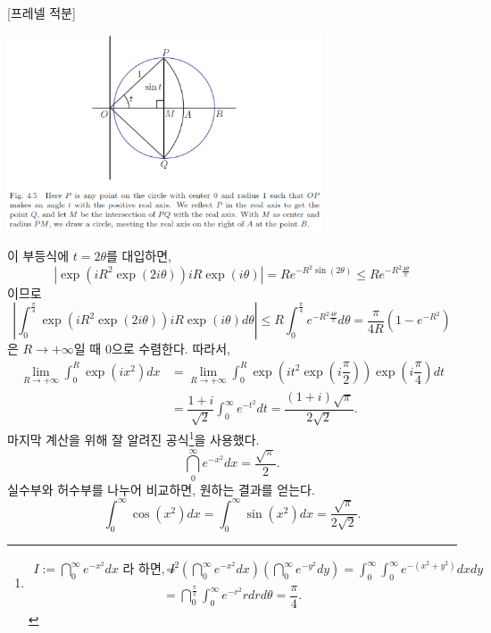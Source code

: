 \begin{saltexample}[label=example-4-20]{[프레넬 적분]}{}
\begin{center}
\includegraphics[width=0.7\textwidth]{./SaltChapter/fig-4-5}
\end{center}
\label{fig-4-5}
이 부등식에 $t=2\theta$를 대입하면,
\[
\left| \exp(iR^2\exp(2i\theta))iR\exp(i\theta) \right|
= Re^{-R^2\sin(2\theta)} \le Re^{-R^2\frac{4\theta}\pi}
\]
이므로
\[
\left| \int_0^{\frac\pi4} \exp(iR^2\exp(2i\theta))iR\exp(i\theta) d\theta\right|
\le R \int_0^{\frac\pi4} e^{-R^2\frac{4\theta}\pi}d\theta
= \dfrac\pi{4R}(1-e^{-R^2})
\]
은 $R\to +\infty$일 때 $0$으로 수렴한다.
따라서, 
\begin{align*}
\lim_{R\to+\infty} \int_0^R \exp(ix^2)dx 
&=  \lim_{R\to+\infty}\int_0^R  \exp\left( it^2\exp\left( i\dfrac\pi2 \right)\right)
\exp\left(i\dfrac\pi4\right) dt \\
&= \dfrac{1+i}{\sqrt{2}} \int_0^\infty e^{-t^2}dt 
= \dfrac{(1+i)\sqrt{\pi}}{2\sqrt{2}}.
\end{align*}
마지막 계산을 위해 잘 알려진 공식\footnote{
\begin{align*}
I:=\dint_0^\infty e^{-x^2} dx\text{  라 하면, \ } 
I^2 &= \left(\dint_0^\infty e^{-x^2} dx\right)\left(\dint_0^\infty e^{-y^2} dy\right) 
= \int_0^\infty \int_0^\infty e^{-(x^2+y^2)}dxdy \\
&= \dint_0^{\frac\pi2} \int_0^\infty e^{-r^2}rdrd\theta = \dfrac\pi4.
\end{align*}
}을 사용했다.
\[
\dint_0^\infty e^{-x^2} dx = \dfrac{\sqrt{\pi}}2.
\]
실수부와 허수부를 나누어 비교하면, 원하는 결과를 얻는다.
\[
\int_0^\infty \cos(x^2) dx =  \int_0^\infty \sin(x^2) dx 
= \dfrac{\sqrt{\pi}}{2\sqrt{2}}.
\]
\end{saltexample}

